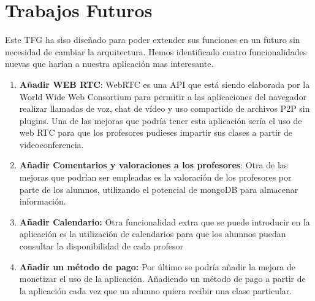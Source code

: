 \section{Trabajos Futuros }
Este TFG ha siso diseñado para poder extender sus funciones en un futuro sin necesidad de cambiar la arquitectura. Hemos identificado cuatro funcionalidades nuevas que harían a nuestra aplicación mas interesante.

\begin{enumerate}

    \item \textbf {Añadir WEB RTC}: WebRTC es una API que está siendo elaborada por la World Wide Web Consortium para permitir a las aplicaciones del navegador realizar llamadas de voz, chat de vídeo y uso compartido de archivos P2P sin plugins. Una de las mejoras que podría tener esta aplicación sería el uso de web RTC para que los profesores pudieses impartir sus clases a partir de videoconferencia.

    \item \textbf {Añadir Comentarios y valoraciones a los profesores}: Otra de las mejoras que podrían ser empleadas es la valoración de los profesores por parte de los alumnos, utilizando el potencial de mongoDB para almacenar información.

    \item \textbf {Añadir Calendario: } Otra funcionalidad extra que se puede introducir en la aplicación es la utilización de calendarios para que los alumnos puedan consultar la disponibilidad de cada profesor

    \item \textbf {Añadir un método de pago:} Por último se podría añadir la mejora de monetizar el uso de la aplicación. Añadiendo un método de pago a partir de la aplicación cada vez que un alumno quiera recibir una clase particular.


\end{enumerate}
